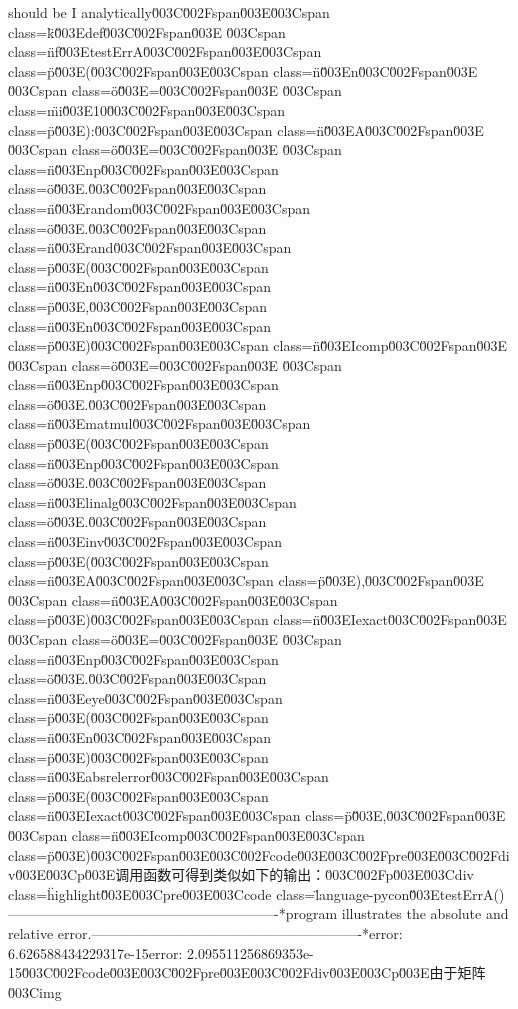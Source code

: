 should be I analytically\u003C\u002Fspan\u003E\n\u003Cspan class=\"k\"\u003Edef\u003C\u002Fspan\u003E \u003Cspan class=\"nf\"\u003EtestErrA\u003C\u002Fspan\u003E\u003Cspan class=\"p\"\u003E(\u003C\u002Fspan\u003E\u003Cspan class=\"n\"\u003En\u003C\u002Fspan\u003E \u003Cspan class=\"o\"\u003E=\u003C\u002Fspan\u003E \u003Cspan class=\"mi\"\u003E10\u003C\u002Fspan\u003E\u003Cspan class=\"p\"\u003E):\u003C\u002Fspan\u003E\n    \u003Cspan class=\"n\"\u003EA\u003C\u002Fspan\u003E \u003Cspan class=\"o\"\u003E=\u003C\u002Fspan\u003E \u003Cspan class=\"n\"\u003Enp\u003C\u002Fspan\u003E\u003Cspan class=\"o\"\u003E.\u003C\u002Fspan\u003E\u003Cspan class=\"n\"\u003Erandom\u003C\u002Fspan\u003E\u003Cspan class=\"o\"\u003E.\u003C\u002Fspan\u003E\u003Cspan class=\"n\"\u003Erand\u003C\u002Fspan\u003E\u003Cspan class=\"p\"\u003E(\u003C\u002Fspan\u003E\u003Cspan class=\"n\"\u003En\u003C\u002Fspan\u003E\u003Cspan class=\"p\"\u003E,\u003C\u002Fspan\u003E\u003Cspan class=\"n\"\u003En\u003C\u002Fspan\u003E\u003Cspan class=\"p\"\u003E)\u003C\u002Fspan\u003E\n    \u003Cspan class=\"n\"\u003EIcomp\u003C\u002Fspan\u003E \u003Cspan class=\"o\"\u003E=\u003C\u002Fspan\u003E \u003Cspan class=\"n\"\u003Enp\u003C\u002Fspan\u003E\u003Cspan class=\"o\"\u003E.\u003C\u002Fspan\u003E\u003Cspan class=\"n\"\u003Ematmul\u003C\u002Fspan\u003E\u003Cspan class=\"p\"\u003E(\u003C\u002Fspan\u003E\u003Cspan class=\"n\"\u003Enp\u003C\u002Fspan\u003E\u003Cspan class=\"o\"\u003E.\u003C\u002Fspan\u003E\u003Cspan class=\"n\"\u003Elinalg\u003C\u002Fspan\u003E\u003Cspan class=\"o\"\u003E.\u003C\u002Fspan\u003E\u003Cspan class=\"n\"\u003Einv\u003C\u002Fspan\u003E\u003Cspan class=\"p\"\u003E(\u003C\u002Fspan\u003E\u003Cspan class=\"n\"\u003EA\u003C\u002Fspan\u003E\u003Cspan class=\"p\"\u003E),\u003C\u002Fspan\u003E \u003Cspan class=\"n\"\u003EA\u003C\u002Fspan\u003E\u003Cspan class=\"p\"\u003E)\u003C\u002Fspan\u003E\n    \u003Cspan class=\"n\"\u003EIexact\u003C\u002Fspan\u003E \u003Cspan class=\"o\"\u003E=\u003C\u002Fspan\u003E \u003Cspan class=\"n\"\u003Enp\u003C\u002Fspan\u003E\u003Cspan class=\"o\"\u003E.\u003C\u002Fspan\u003E\u003Cspan class=\"n\"\u003Eeye\u003C\u002Fspan\u003E\u003Cspan class=\"p\"\u003E(\u003C\u002Fspan\u003E\u003Cspan class=\"n\"\u003En\u003C\u002Fspan\u003E\u003Cspan class=\"p\"\u003E)\u003C\u002Fspan\u003E\n    \u003Cspan class=\"n\"\u003Eabsrelerror\u003C\u002Fspan\u003E\u003Cspan class=\"p\"\u003E(\u003C\u002Fspan\u003E\u003Cspan class=\"n\"\u003EIexact\u003C\u002Fspan\u003E\u003Cspan class=\"p\"\u003E,\u003C\u002Fspan\u003E \u003Cspan class=\"n\"\u003EIcomp\u003C\u002Fspan\u003E\u003Cspan class=\"p\"\u003E)\u003C\u002Fspan\u003E\u003C\u002Fcode\u003E\u003C\u002Fpre\u003E\u003C\u002Fdiv\u003E\u003Cp\u003E调用函数可得到类似如下的输出：\u003C\u002Fp\u003E\u003Cdiv class=\"highlight\"\u003E\u003Cpre\u003E\u003Ccode class=\"language-pycon\"\u003EtestErrA()\n*----------------------------------------------------------*\nThis program illustrates the absolute and relative error.\n*----------------------------------------------------------*\nAbsolute error: 6.626588434229317e-15\nRelative error: 2.095511256869353e-15\u003C\u002Fcode\u003E\u003C\u002Fpre\u003E\u003C\u002Fdiv\u003E\u003Cp\u003E由于矩阵 \u003Cimg 